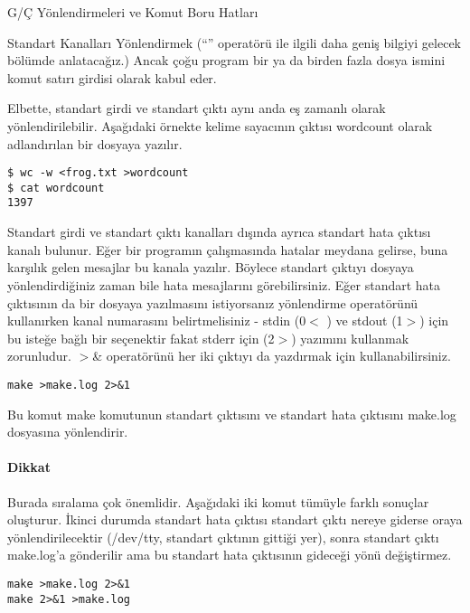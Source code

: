 \begin{section}{G/Ç Yönlendirmeleri ve Komut Boru Hatları}
\begin{subsection}{Standart Kanalları Yönlendirmek}
(“\textbar” operatörü ile ilgili daha geniş bilgiyi gelecek bölümde anlatacağız.) Ancak çoğu program bir ya da birden fazla dosya ismini komut satırı girdisi olarak kabul eder.

Elbette, standart girdi ve standart çıktı aynı anda eş zamanlı olarak yönlendirilebilir.  Aşağıdaki örnekte kelime sayacının çıktısı wordcount olarak adlandırılan bir dosyaya yazılır.
\begin{verbatim}
$ wc -w <frog.txt >wordcount
$ cat wordcount
1397
\end{verbatim}

Standart girdi ve standart çıktı kanalları dışında ayrıca standart hata çıktısı kanalı bulunur. Eğer bir programın çalışmasında hatalar meydana gelirse, buna karşılık gelen mesajlar bu kanala yazılır. Böylece standart çıktıyı dosyaya yönlendirdiğiniz zaman bile hata mesajlarını görebilirsiniz. Eğer standart hata çıktısının da bir dosyaya yazılmasını istiyorsanız yönlendirme operatörünü kullanırken kanal numarasını belirtmelisiniz - stdin (0$<$ ) ve stdout (1$>$) için bu isteğe bağlı bir seçenektir fakat stderr için (2$>$) yazımını kullanmak zorunludur. $>$\& operatörünü her iki çıktıyı da yazdırmak için kullanabilirsiniz.
\begin{verbatim}
make >make.log 2>&1
\end{verbatim}

Bu komut make komutunun standart çıktısını ve standart hata çıktısını make.log dosyasına yönlendirir.

\paragraph{Dikkat}{Burada sıralama çok önemlidir. Aşağıdaki iki komut tümüyle farklı sonuçlar oluşturur. İkinci durumda standart hata çıktısı standart çıktı nereye giderse oraya yönlendirilecektir (/dev/tty, standart çıktının gittiği yer), sonra standart çıktı make.log'a gönderilir ama bu standart hata çıktısının gideceği yönü değiştirmez.}
\begin{verbatim}
make >make.log 2>&1 
make 2>&1 >make.log 
\end{verbatim}


\end{subsection}
\end{section}
